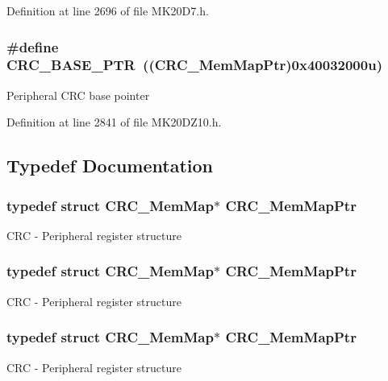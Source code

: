Definition at line 2696 of file M\+K20\+D7.\+h.

\subsubsection[{\texorpdfstring{C\+R\+C\+\_\+\+B\+A\+S\+E\+\_\+\+P\+TR}{CRC_BASE_PTR}}]{\setlength{\rightskip}{0pt plus 5cm}\#define C\+R\+C\+\_\+\+B\+A\+S\+E\+\_\+\+P\+TR~(({\bf C\+R\+C\+\_\+\+Mem\+Map\+Ptr})0x40032000u)}\hypertarget{group___c_r_c___peripheral_ga139bd4056b9e3c7987d28b6e955b662d}{}\label{group___c_r_c___peripheral_ga139bd4056b9e3c7987d28b6e955b662d}
Peripheral C\+RC base pointer 

Definition at line 2841 of file M\+K20\+D\+Z10.\+h.



\subsection{Typedef Documentation}
\subsubsection[{\texorpdfstring{C\+R\+C\+\_\+\+Mem\+Map\+Ptr}{CRC_MemMapPtr}}]{\setlength{\rightskip}{0pt plus 5cm}typedef struct {\bf C\+R\+C\+\_\+\+Mem\+Map}$\ast$ {\bf C\+R\+C\+\_\+\+Mem\+Map\+Ptr}}\hypertarget{group___c_r_c___peripheral_ga65ec00368ee39504a8a83cd736901b84}{}\label{group___c_r_c___peripheral_ga65ec00368ee39504a8a83cd736901b84}
C\+RC -\/ Peripheral register structure 
\subsubsection[{\texorpdfstring{C\+R\+C\+\_\+\+Mem\+Map\+Ptr}{CRC_MemMapPtr}}]{\setlength{\rightskip}{0pt plus 5cm}typedef struct {\bf C\+R\+C\+\_\+\+Mem\+Map}$\ast$ {\bf C\+R\+C\+\_\+\+Mem\+Map\+Ptr}}\hypertarget{group___c_r_c___peripheral_ga65ec00368ee39504a8a83cd736901b84}{}\label{group___c_r_c___peripheral_ga65ec00368ee39504a8a83cd736901b84}
C\+RC -\/ Peripheral register structure 
\subsubsection[{\texorpdfstring{C\+R\+C\+\_\+\+Mem\+Map\+Ptr}{CRC_MemMapPtr}}]{\setlength{\rightskip}{0pt plus 5cm}typedef struct {\bf C\+R\+C\+\_\+\+Mem\+Map}$\ast$ {\bf C\+R\+C\+\_\+\+Mem\+Map\+Ptr}}\hypertarget{group___c_r_c___peripheral_ga65ec00368ee39504a8a83cd736901b84}{}\label{group___c_r_c___peripheral_ga65ec00368ee39504a8a83cd736901b84}
C\+RC -\/ Peripheral register structure 